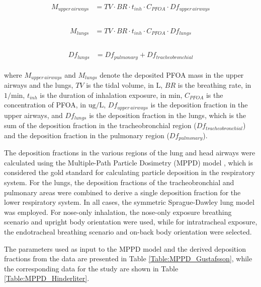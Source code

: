 \documentclass[preprint,12pt,authoryear]{elsarticle}
\begin{document}
\begin{align}
\begin{aligned}
M_{upper \, airways} &= TV \cdot BR \cdot t_{inh} \cdot C_{PFOA} \cdot Df_{upper \, airways}\\
\end{aligned} 
\end{align}


\begin{align}
\begin{aligned}
M_{lungs} &= TV \cdot BR \cdot t_{inh} \cdot C_{PFOA} \cdot Df_{lungs}\\
\end{aligned} 
\end{align}

\begin{align}
\begin{aligned}
Df_{lungs} &= Df_{pulmonary} +  Df_{tracheobronchial}
\end{aligned} 
\end{align}

\noindent
where $M_{upper \, airways}$ and $M_{lungs}$ denote the deposited PFOA mass in the upper airways and the lungs, $TV$ is the tidal volume, in $\text{L}$, $BR$ is the breathing rate, in $1/\text{min}$, $t_{inh}$ is the duration of inhalation exposure, in $\text{min}$, $C_{PFOA}$ is the concentration of PFOA, in $\text{ug}/\text{L}$, $Df_{upper \, airways}$ is the deposition fraction in the upper airways, and $Df_{lungs}$ is the deposition fraction in the lungs, which is the sum of the deposition fraction in the tracheobronchial region ($Df_{tracheobronchial}$) and the deposition fraction in the pulmonary region ($Df_{pulmonary}$).

The deposition fractions in the various regions of the lung and head airways were calculated using the Multiple-Path Particle Dosimetry (MPPD) model \citep{anjilvel_1995}, which is considered the gold standard for calculating particle deposition in the respiratory system. For the lungs, the deposition fractions of the tracheobronchial and pulmonary areas were combined to derive a single deposition fraction for the lower respiratory system. In all cases, the symmetric Sprague-Dawley lung model was employed. For nose-only inhalation, the nose-only exposure breathing scenario and upright body orientation were used, while for intratracheal exposure, the endotracheal breathing scenario and on-back body orientation were selected.

The parameters used as input to the MPPD model and the derived deposition fractions from the \citep{gustafsson_2022} data are presented in Table \ref{Table:MPPD_Gustafsson}, while the corresponding data for the \citep{hinderliter_2006} study are shown in Table \ref{Table:MPPD_Hinderliter}.
\end{document}
